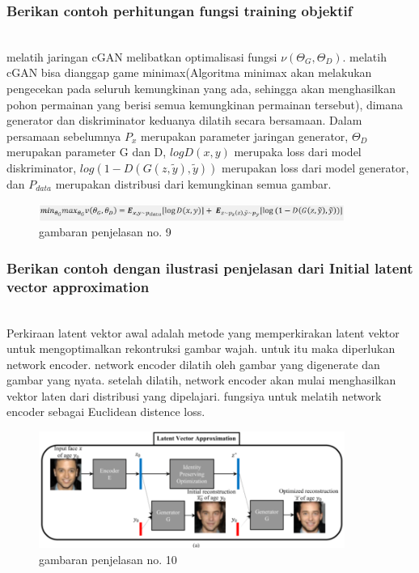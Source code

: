 \subsubsection{Berikan contoh perhitungan fungsi training objektif}
\hfill\\
melatih jaringan cGAN melibatkan optimalisasi fungsi $\nu(\Theta _{G},\Theta _{D})$. melatih cGAN bisa dianggap game minimax(Algoritma minimax akan melakukan pengecekan pada seluruh kemungkinan yang ada, sehingga akan menghasilkan pohon permainan yang berisi semua kemungkinan permainan tersebut), dimana generator dan diskriminator keduanya dilatih secara bersamaan. Dalam persamaan sebelumnya $P_{x}$ merupakan parameter jaringan generator, $\Theta _{D}$ merupakan parameter G dan D, $logD(x,y)$ merupaka loss dari model diskriminator, $log(1-D(G(z,\tilde{y}),\tilde{y}))$ merupakan loss dari model generator, dan $P_{data}$ merupakan distribusi dari kemungkinan semua gambar.
\begin{figure}[H]
	\centering
	\includegraphics[width=10cm]{figures/1174083/figures9/9.png}
	\caption{gambaran penjelasan no. 9}
\end{figure}

\subsubsection{Berikan contoh dengan ilustrasi penjelasan dari Initial latent vector approximation}
\hfill\\
Perkiraan latent vektor awal adalah metode yang memperkirakan latent vektor untuk mengoptimalkan rekontruksi gambar wajah. untuk itu maka diperlukan network encoder. network encoder dilatih oleh gambar yang digenerate dan gambar yang nyata. setelah dilatih, network encoder akan mulai menghasilkan vektor laten dari distribusi yang dipelajari. fungsiya untuk melatih network encoder sebagai Euclidean distence loss.
\begin{figure}[H]
	\centering
	\includegraphics[width=10cm]{figures/1174083/figures9/10.png}
	\caption{gambaran penjelasan no. 10}
\end{figure}


